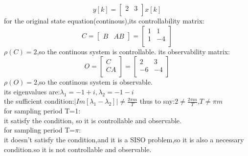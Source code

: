 \documentclass{article}
\begin{document}
\[
y[k]=
\left[
\begin{array}{cc}
2 &3\\
\end{array}
\right]x[k]
\]
for the original state equation(continous),its controllability matrix:
\[
    C=
    \left[
    \begin{array}{cc}
    B & AB
    \end{array}
    \right]   
    =
    \left[
        \begin{array}{cc}
        1 & 1\\
        1 & -4\\
        \end{array}
    \right]  
\]
$\rho(C)=2$,so the continous system is controllable.
its observability matrix:
\[
    O=
    \left[
    \begin{array}{c}
    C \\
    CA \\
    \end{array}
    \right]   
    =
    \left[
        \begin{array}{cc}
        2 & 3\\
        -6 & -4\\
        \end{array}
    \right]  
\]
$\rho(O)=2$,so the continous system is observable.\\
its eigenvalues are:$\lambda_1=-1+i,\lambda_2=-1-i$\\
the sufficient condition:$\vert{Im[\lambda_1-\lambda_2]}\vert \neq \frac{2\pi m}{T}$
thus to say:$2 \neq \frac{2\pi m}{T}$,$T \neq \pi m$\\
for sampling period T=1:\\
it satisfy the condition, so it is controllable and observable.\\
for sampling period T=$\pi$:\\
it doesn't satisfy the condition,and it is a SISO problem,so it is also a necessary condition.so it is not controllable and observable.
\end{document}
